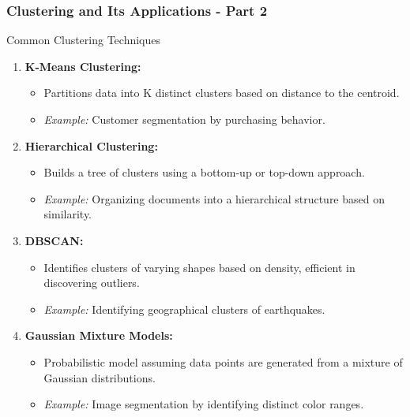 \documentclass[aspectratio=169]{beamer}
\begin{document}
\begin{frame}[fragile]
    \frametitle{Clustering and Its Applications - Part 2}
    \begin{block}{Common Clustering Techniques}
        \begin{enumerate}
            \item \textbf{K-Means Clustering:}
                \begin{itemize}
                    \item Partitions data into K distinct clusters based on distance to the centroid.
                    \item \textit{Example:} Customer segmentation by purchasing behavior.
                \end{itemize}
                
            \item \textbf{Hierarchical Clustering:}
                \begin{itemize}
                    \item Builds a tree of clusters using a bottom-up or top-down approach.
                    \item \textit{Example:} Organizing documents into a hierarchical structure based on similarity.
                \end{itemize}
                
            \item \textbf{DBSCAN:}
                \begin{itemize}
                    \item Identifies clusters of varying shapes based on density, efficient in discovering outliers.
                    \item \textit{Example:} Identifying geographical clusters of earthquakes.
                \end{itemize}
                
            \item \textbf{Gaussian Mixture Models:}
                \begin{itemize}
                    \item Probabilistic model assuming data points are generated from a mixture of Gaussian distributions.
                    \item \textit{Example:} Image segmentation by identifying distinct color ranges.
                \end{itemize}
        \end{enumerate}
    \end{block}
\end{frame}
\end{document}
